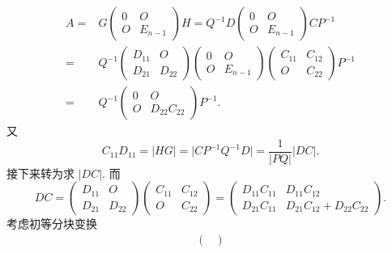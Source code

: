 \begin{enumerate}
\begin{enumerate}
\begin{enumerate}
\begin{align*}
                A ={} & G\begin{pmatrix}
                    0 & O \\
                    O & E_{n-1}
                \end{pmatrix}H = Q^{-1}D\begin{pmatrix}
                    0 & O \\
                    O & E_{n-1}
                \end{pmatrix}CP^{-1} \\ ={} &Q^{-1}\begin{pmatrix}
                    D_{11} & O \\
                    D_{21} & D_{22}
                \end{pmatrix} \begin{pmatrix}
                    0 & O \\
                    O & E_{n-1}
                \end{pmatrix} \begin{pmatrix}
                    C_{11} & C_{12} \\
                    O & C_{22}
                \end{pmatrix} P^{-1} \\ ={} & Q^{-1} \begin{pmatrix}
                    0 & O \\
                    O & D_{22}C_{22}
                \end{pmatrix} P^{-1}.
            \end{align*} 又 \[C_{11}D_{11} = \lvert HG \rvert = \lvert CP^{-1}Q^{-1}D \rvert = \dfrac{1}{\lvert PQ \rvert}\lvert DC \rvert.\] 接下来转为求 $\lvert DC \rvert$. 而 \[DC = \begin{pmatrix}
                D_{11} & O \\
                D_{21} & D_{22}
            \end{pmatrix} \begin{pmatrix}
                C_{11} & C_{12} \\
                O & C_{22}
            \end{pmatrix} = \begin{pmatrix}
                D_{11}C_{11} & D_{11}C_{12} \\
                D_{21}C_{11} & D_{21}C_{12}+D_{22}C_{22}
            \end{pmatrix}.\] 考虑初等分块变换 \begin{align*}
                \begin{pmatrix}

\end{pmatrix}
\end{align*}
\end{enumerate}
\end{enumerate}
\end{enumerate}

